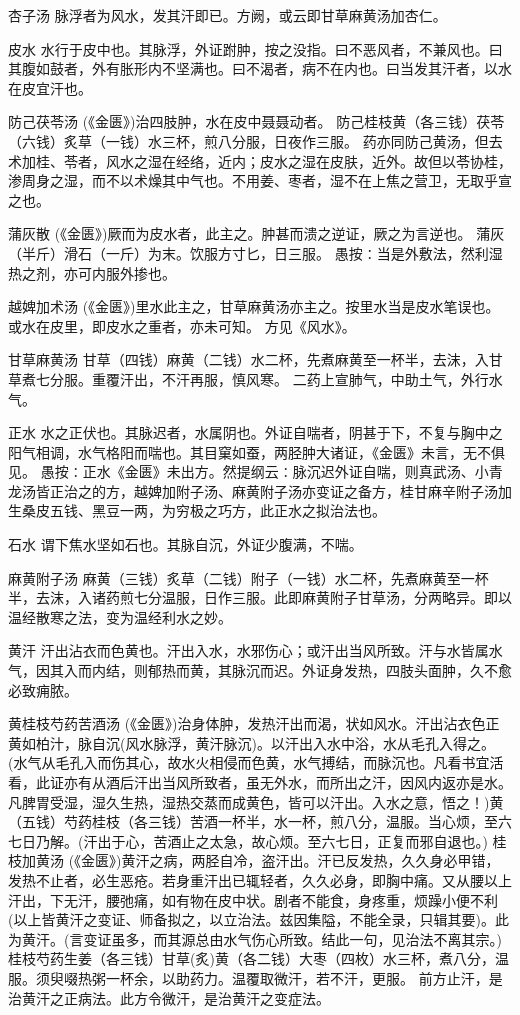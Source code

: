 \documentclass[a4paper,12pt,UTF8,twoside]{ctexbook}
\begin{document}
	杏子汤
	脉浮者为风水，发其汗即已。方阙，或云即甘草麻黄汤加杏仁。
	
	
	皮水	
	水行于皮中也。其脉浮，外证跗肿，按之没指。曰不恶风者，不兼风也。曰其腹如鼓者，外有胀形内不坚满也。曰不渴者，病不在内也。曰当发其汗者，以水在皮宜汗也。
	
	防己茯苓汤
	(《金匮》)治四肢肿，水在皮中聂聂动者。
	防己桂枝黄（各三钱）茯苓（六钱）炙草（一钱）水三杯，煎八分服，日夜作三服。
	药亦同防己黄汤，但去术加桂、苓者，风水之湿在经络，近内；皮水之湿在皮肤，近外。故但以苓协桂，渗周身之湿，而不以术燥其中气也。不用姜、枣者，湿不在上焦之营卫，无取乎宣之也。
	
	蒲灰散
	(《金匮》)厥而为皮水者，此主之。肿甚而溃之逆证，厥之为言逆也。
	蒲灰（半斤）滑石（一斤）为末。饮服方寸匕，日三服。
	愚按∶当是外敷法，然利湿热之剂，亦可内服外掺也。
	
	越婢加术汤
	(《金匮》)里水此主之，甘草麻黄汤亦主之。按里水当是皮水笔误也。或水在皮里，即皮水之重者，亦未可知。
	方见《风水》。
	
	甘草麻黄汤
	甘草（四钱）麻黄（二钱）水二杯，先煮麻黄至一杯半，去沫，入甘草煮七分服。重覆汗出，不汗再服，慎风寒。
	二药上宣肺气，中助土气，外行水气。
	
	
	正水	
	水之正伏也。其脉迟者，水属阴也。外证自喘者，阴甚于下，不复与胸中之阳气相调，水气格阳而喘也。其目窠如蚕，两胫肿大诸证，《金匮》未言，无不俱见。
	愚按∶正水《金匮》未出方。然提纲云∶脉沉迟外证自喘，则真武汤、小青龙汤皆正治之的方，越婢加附子汤、麻黄附子汤亦变证之备方，桂甘麻辛附子汤加生桑皮五钱、黑豆一两，为穷极之巧方，此正水之拟治法也。
	
	
	石水	
	谓下焦水坚如石也。其脉自沉，外证少腹满，不喘。
	
	麻黄附子汤
	麻黄（三钱）炙草（二钱）附子（一钱）水二杯，先煮麻黄至一杯半，去沫，入诸药煎七分温服，日作三服。此即麻黄附子甘草汤，分两略异。即以温经散寒之法，变为温经利水之妙。
	
	
	黄汗	
	汗出沾衣而色黄也。汗出入水，水邪伤心；或汗出当风所致。汗与水皆属水气，因其入而内结，则郁热而黄，其脉沉而迟。外证身发热，四肢头面肿，久不愈必致痈脓。
	
	黄桂枝芍药苦酒汤
	(《金匮》)治身体肿，发热汗出而渴，状如风水。汗出沾衣色正黄如柏汁，脉自沉(风水脉浮，黄汗脉沉)。以汗出入水中浴，水从毛孔入得之。(水气从毛孔入而伤其心，故水火相侵而色黄，水气搏结，而脉沉也。凡看书宜活看，此证亦有从酒后汗出当风所致者，虽无外水，而所出之汗，因风内返亦是水。凡脾胃受湿，湿久生热，湿热交蒸而成黄色，皆可以汗出。入水之意，悟之！)黄（五钱）芍药桂枝（各三钱）苦酒一杯半，水一杯，煎八分，温服。当心烦，至六七日乃解。(汗出于心，苦酒止之太急，故心烦。至六七日，正复而邪自退也。)
	桂枝加黄汤
	(《金匮》)黄汗之病，两胫自冷，盗汗出。汗已反发热，久久身必甲错，发热不止者，必生恶疮。若身重汗出已辄轻者，久久必身，即胸中痛。又从腰以上汗出，下无汗，腰弛痛，如有物在皮中状。剧者不能食，身疼重，烦躁小便不利(以上皆黄汗之变证、师备拟之，以立治法。兹因集隘，不能全录，只辑其要)。此为黄汗。(言变证虽多，而其源总由水气伤心所致。结此一句，见治法不离其宗。)桂枝芍药生姜（各三钱）甘草(炙)黄（各二钱）大枣（四枚）水三杯，煮八分，温服。须臾啜热粥一杯余，以助药力。温覆取微汗，若不汗，更服。
	前方止汗，是治黄汗之正病法。此方令微汗，是治黄汗之变症法。
	
\end{document}
